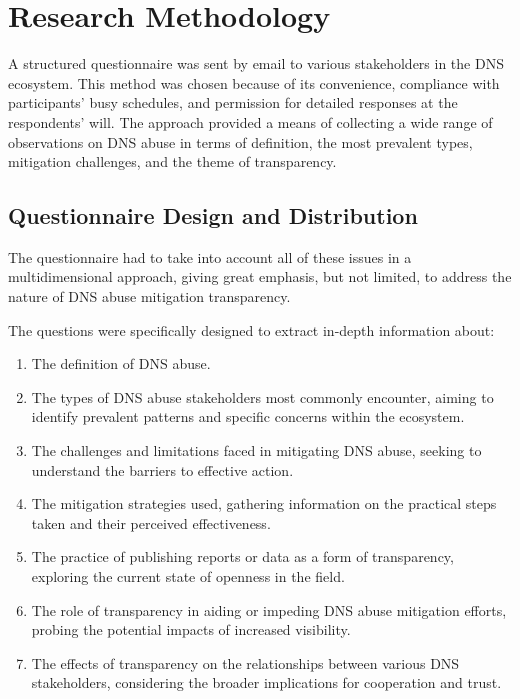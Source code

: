 \chapter{Research Methodology}



A structured questionnaire was sent by email to various stakeholders in the DNS ecosystem. This method was chosen because of its convenience, compliance with participants' busy schedules, and permission for detailed responses at the respondents' will. The approach provided a means of collecting a wide range of observations on DNS abuse in terms of definition, the most prevalent types, mitigation challenges, and the theme of transparency. 



\section{Questionnaire Design and Distribution} 

The questionnaire had to take into account all of these issues in a multidimensional approach, giving great emphasis, but not limited, to address the nature of DNS abuse mitigation transparency.

The questions were specifically designed to extract in-depth information about:


 \begin{enumerate}
 \item The definition of DNS abuse. 
  \item The types of DNS abuse stakeholders most commonly encounter, aiming to identify prevalent patterns and specific concerns within the ecosystem.
  
  \item The challenges and limitations faced in mitigating DNS abuse, seeking to understand the barriers to effective action.
  
  \item The mitigation strategies used, gathering information on the practical steps taken and their perceived effectiveness.
  
  \item The practice of publishing reports or data as a form of transparency, exploring the current state of openness in the field.
  
  \item The role of transparency in aiding or impeding DNS abuse mitigation efforts, probing the potential impacts of increased visibility.
  
  \item  The effects of transparency on the relationships between various DNS stakeholders, considering the broader implications for cooperation and trust.
\end{enumerate}


